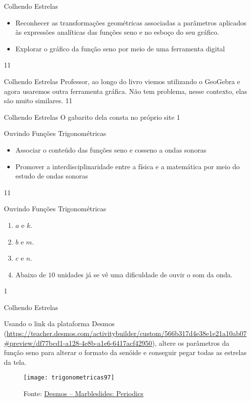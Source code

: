 \label{trig-prac4}
\begin{objectives}{Colhendo Estrelas}
{
\begin{itemize}
\item Reconhecer as transformações geométricas associadas a
parâmetros aplicados às expressões analíticas das funções
seno e no esboço do seu gráfico.
\item Explorar o gráfico da função seno por meio de uma
ferramenta digital
\end{itemize}
}{1}{1}
\end{objectives}
\begin{sugestions}{Colhendo Estrelas}
{
Professor, ao longo do livro viemos utilizando o GeoGebra e
agora usaremos outra ferramenta gráfica. Não tem problema,
nesse contexto, elas são muito similares.
}{1}{1}
\end{sugestions}
\begin{answer}{Colhendo Estrelas}
{
O gabarito dela consta no próprio site
}{1}
\end{answer}
\clearmargin
\begin{objectives}{Ouvindo Funções Trigonométricas}
{
\begin{itemize}
\item Associar o conteúdo das funções seno e cosseno a ondas sonoras
\item Promover a interdisciplinaridade entre a física e a matemática por meio do estudo de ondas sonoras
\end{itemize}
}{1}{1}
\end{objectives}
\begin{answer}{Ouvindo Funções Trigonométricas}
{
\begin{enumerate}
\item $a$ e $k$.
\item $b$ e $m$.
\item $c$ e $n$.
\item Abaixo de $10$ unidades já se vê uma dificuldade de ouvir o som da onda.
\end{enumerate}
}{1}
\end{answer}


\begin{task}{Colhendo Estrelas}
\label{trig-ativ19}

Usando o link da plataforma Desmos (\url{https://teacher.desmos.com/activitybuilder/custom/566b317d4e38e1e21a10ab07\#preview/df77bcd1-a128-4e8b-a1e6-6417acf42950}), altere os parâmetros da função seno para alterar o formato da senóide e conseguir pegar todas as estrelas da tela.

\begin{figure}[H]
\centering

\texttt{[image: trigonometricas97]}
\caption{Fonte: \href{https://teacher.desmos.com/activitybuilder/custom/566b317d4e38e1e21a10ab07\#preview/df77bcd1-a128-4e8b-a1e6-6417acf42950}{Desmos -- Marbleslides: Periodics}}

\end{figure}

\end{task}

